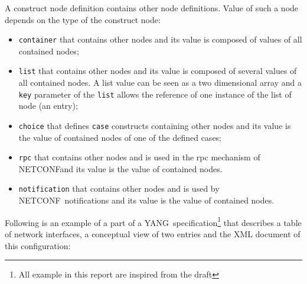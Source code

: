 \documentclass[a4paper]{article}
\newcommand{\nc}{NETCONF}
\newcommand{\y}{YANG}
\begin{document}
A construct node definition  contains other node definitions. Value of
such a node depends on the type of the construct node:
\begin{itemize}
\item
{\tt container} that contains other nodes and its value is composed of
values of all contained nodes;
\item
{\tt list} that contains other nodes and its value is composed of
several values of all contained nodes.  A list value can be seen  as a two
dimensional array  and a {\tt key}  parameter of the  {\tt list} allows
the reference of one instance of the list of node (an entry);
\item
{\tt choice} that defines {\tt case} constructs containing other nodes
and its value is the value of contained nodes of one of the defined
cases;
\item
{\tt rpc} that  contains other nodes and is used  in the rpc mechanism
of \nc and its value is the value of contained nodes.
\item
{\tt  notification} that  contains other  nodes  and is  used by  \nc\
notifications and its value is the value of contained nodes.
\end{itemize}

Following is an example of  a part of a \y\ specification\footnote{All
example in  this report are  inspired from the  draft\cite{yang01}} that
describes  a table  of network  interfaces, a  conceptual view  of two
entries and the XML document of this configuration:
\end{document}
